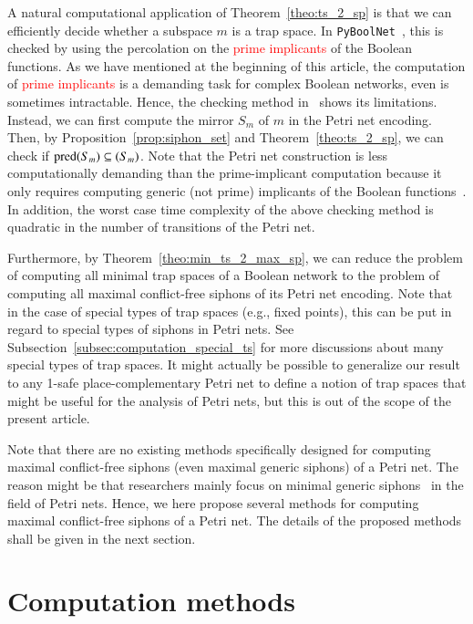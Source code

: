 \documentclass[preprint,12pt]{elsarticle}
\newcommand{\change}[1]{\textcolor{red}{#1}}
\DeclareMathOperator{\pred}{pred}
\let\succ\relax
\DeclareMathOperator{\succ}{succ}
\begin{document}
A natural computational application of Theorem~\ref{theo:ts_2_sp} is that we can efficiently decide whether a subspace \(m\) is a trap space.
In \texttt{PyBoolNet}~\cite{klarner2017pyboolnet}, this is checked by using the percolation on the \change{prime implicants} of the Boolean functions.
As we have mentioned at the beginning of this article, the computation of \change{prime implicants} is a demanding task for complex Boolean networks, even is sometimes intractable.
Hence, the checking method in~\cite{klarner2017pyboolnet} shows its limitations.
Instead, we can first compute the mirror \(S_m\) of \(m\) in the Petri net encoding.
Then, by Proposition~\ref{prop:siphon_set} and Theorem~\ref{theo:ts_2_sp}, we can check if \(\pred(S_m) \subseteq \succ(S_m)\).
Note that the Petri net construction is less computationally demanding than the prime-implicant computation because it only requires computing generic (not prime) implicants of the Boolean functions~\cite{chatain2014characterization}.
In addition, the worst case time complexity of the above checking method is quadratic in the number of transitions of the Petri net.

Furthermore, by Theorem~\ref{theo:min_ts_2_max_sp}, we can reduce the problem of computing all minimal trap spaces of a Boolean network to the problem of computing all maximal conflict-free siphons of its Petri net encoding.
Note that in the case of special types of trap spaces (e.g., fixed points), this can be put in regard to special types of siphons in Petri nets.
See Subsection~\ref{subsec:computation_special_ts} for more discussions about many special types of trap spaces.
It might actually be possible to generalize our result to any 1-safe place-complementary Petri net to define a notion of trap spaces that might be useful for the analysis of Petri nets, but this is out of the scope of the present article.

Note that there are no existing methods specifically designed for computing maximal conflict-free siphons (even maximal generic siphons) of a Petri net.
The reason might be that researchers mainly focus on minimal generic siphons~\cite{DBLP:journals/isci/LiuB16} in the field of Petri nets.
Hence, we here propose several methods for computing maximal conflict-free siphons of a Petri net.
The details of the proposed methods shall be given in the next section.

\section{Computation methods}%
\label{sec:Computation}
\end{document}
